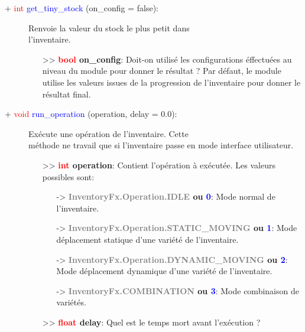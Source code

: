 \documentclass[a4paper, 11pt]{article}
\begin{document}
	\newpage \begin{description}
		\item [+ \textcolor{red}{int} \textcolor{blue}{get\_tiny\_stock} (on\_config = false):] Renvoie la 
		valeur du stock le plus petit dans \\l'inventaire.
		\begin{itemize}
			\item[>> \textbf{\textcolor{red}{bool} on\_config}:] Doit-on utilisé les configurations 
			éffectuées au niveau du module pour donner le résultat ? Par défaut, le module utilise les 
			valeurs issues de la progression de l'inventaire pour donner le résultat final.\\
		\end{itemize}
	\end{description}
	\begin{description}
		\item [+ \textcolor{red}{void} \textcolor{blue}{run\_operation} (operation, delay = 0.0):] Exécute 
		une opération de l'inventaire. Cette \\méthode ne travail que si l'inventaire passe en mode 
		interface utilisateur.
		\begin{itemize}
			\item[>> \textbf{\textcolor{red}{int} operation}:] Contient l'opération à exécutée. Les valeurs
			possibles sont:
			\begin{itemize}
				\item [-> \textbf{\textcolor{gray}{InventoryFx.Operation.IDLE} ou \textcolor{blue}{0}}:] 
				Mode normal de l'inventaire.
				\item [-> \textbf{\textcolor{gray}{InventoryFx.Operation.STATIC\_MOVING} ou \textcolor{blue}
				{1}}:] Mode déplacement statique d'une variété de l'inventaire.
				\item [-> \textbf{\textcolor{gray}{InventoryFx.Operation.DYNAMIC\_MOVING} ou 
				\textcolor{blue}{2}}:] Mode déplacement dynamique d'une variété de l'inventaire.
				\item [-> \textbf{\textcolor{gray}{InventoryFx.COMBINATION} ou \textcolor{blue}{3}}:] 
				Mode combinaison de variétés.
			\end{itemize}
			\item [>> \textbf{\textcolor{red}{float} delay}:] Quel est le temps mort avant l'exécution ?\\
		\end{itemize}
	\end{description}
\end{document}
